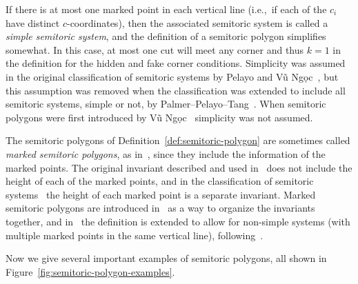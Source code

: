 \documentclass[pdftex]{sigma}
\numberwithin{equation}{section}
\begin{document}
\begin{Remark}
If there is at most one marked point in each vertical line (i.e.,~if each of the $c_i$ have distinct $c$-coordinates), then the associated semitoric system is called a \emph{simple semitoric system}, and the definition of a semitoric polygon simplifies somewhat. In this case, at most one cut will meet any corner and thus $k=1$ in the definition for the hidden and fake corner conditions.
Simplicity was assumed in the original classification of semitoric systems by Pelayo and V\~{u} Ng\d{o}c~\cite{PeVN2009, PeVN2011}, but this assumption was removed when the classification was extended to include all semitoric systems, simple or not, by Palmer--Pelayo--Tang~\cite{PPT-nonsimple}.
When semitoric polygons were first introduced by V\~{u} Ng\d{o}c~\cite{VN2007} simplicity was not assumed.
\end{Remark}


\begin{Remark}
The semitoric polygons of Definition~\ref{def:semitoric-polygon} are sometimes called \emph{marked semitoric polygons}, as in~\cite{LFPal}, since they include the information of the marked points. The original invariant described and used in~\cite{VN2007} does not include the height of each of the marked points, and in the classification of semitoric systems~\cite{PeVN2009, PeVN2011} the height of each marked point is a separate invariant. Marked semitoric polygons are introduced in~\cite{LFPal}
as a way to organize the invariants together, and in~\cite{HP-extend} the definition is extended to allow for non-simple systems (with multiple marked points in the same vertical line), following~\cite{PPT-nonsimple}.
\end{Remark}

Now we give several important examples of semitoric polygons, all shown in Figure~\ref{fig:semitoric-polygon-examples}.
\end{document}
